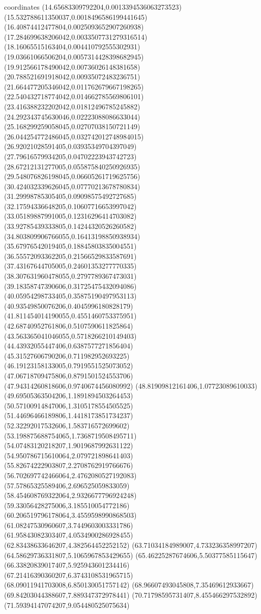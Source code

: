 coordinates {%
(14.65683309792204,0.0013394536063273523)
(15.532788611350037,0.0018496586199441645)
(16.40874412477804,0.0025093652907260938)
(17.284699638206042,0.0033507731279316514)
(18.16065515163404,0.004410792555302931)
(19.03661066506204,0.0057314428398682945)
(19.912566178490042,0.00736026148381658)
(20.788521691918042,0.00935072483236751)
(21.664477205346042,0.011762679667198265)
(22.540432718774042,0.014662785569806101)
(23.416388232202042,0.01812496785245882)
(24.292343745630046,0.02223088086633044)
(25.168299259058045,0.02707038150721149)
(26.044254772486045,0.032742012748984015)
(26.92021028591405,0.03935349704397049)
(27.79616579934205,0.04702223943742723)
(28.67212131277005,0.055875840250926935)
(29.548076826198045,0.06605261719625756)
(30.424032339626045,0.07770213678780834)
(31.29998785305405,0.09098575492727685)
(32.17594336648205,0.10607716653997042)
(33.05189887991005,0.12316296414703082)
(33.92785439333805,0.14244320526260582)
(34.803809906766055,0.16413198850938934)
(35.67976542019405,0.18845803835004551)
(36.55572093362205,0.21566529833587691)
(37.43167644705005,0.24601353277770335)
(38.307631960478055,0.2797789367473031)
(39.18358747390606,0.31725475432094086)
(40.05954298733405,0.35875190497953113)
(40.93549850076206,0.4045996180828179)
(41.811454014190055,0.4551460753375951)
(42.68740952761806,0.5107590611825864)
(43.563365041046055,0.5718266210149403)
(44.43932055447406,0.6387577271856404)
(45.31527606790206,0.711982952693225)
(46.19123158133005,0.7919551525073052)
(47.06718709475806,0.8791501524553706)
(47.94314260818606,0.9740674456080992)
(48.81909812161406,1.07723089610033)
(49.69505363504206,1.1891894503264453)
(50.57100914847006,1.3105178554505525)
(51.44696466189806,1.4418173851734237)
(52.32292017532606,1.583716572699602)
(53.198875688754065,1.7368719508495711)
(54.07483120218207,1.9019687992631122)
(54.950786715610064,2.079721898641403)
(55.82674222903807,2.2708762919766676)
(56.702697742466064,2.4762080527192083)
(57.57865325589406,2.696525059833059)
(58.454608769322064,2.9326677796924248)
(59.33056428275006,3.185510054772186)
(60.206519796178064,3.4559598990868503)
(61.08247530960607,3.7449603003331786)
(61.95843082303407,4.0534900286928455)
(62.83438633646207,4.382564452252152)
(63.71034184989007,4.733236358997207)
(64.58629736331807,5.1065967853429655)
(65.46225287674606,5.50377585115647)
(66.33820839017407,5.925943601234416)
(67.21416390360207,6.3743108531965715)
(68.09011941703008,6.850130051757142)
(68.96607493045808,7.35469612933667)
(69.84203044388607,7.889347372978441)
(70.71798595731407,8.455466297532892)
(71.59394147074207,9.054480525075634)
}
